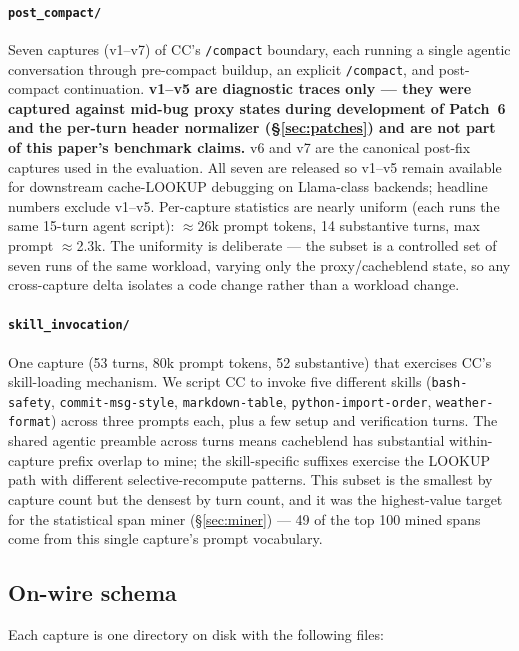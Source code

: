 \paragraph{\texttt{post\_compact/}} Seven captures (v1--v7) of CC's
\texttt{/compact} boundary, each running a single agentic conversation
through pre-compact buildup, an explicit \texttt{/compact}, and
post-compact continuation. \textbf{v1--v5 are diagnostic traces only ---
they were captured against mid-bug proxy states during development of
Patch~6 and the per-turn header normalizer (\S\ref{sec:patches}) and
are not part of this paper's benchmark claims.} v6 and v7 are the
canonical post-fix captures used in the evaluation. All seven are
released so v1--v5 remain available for downstream cache-LOOKUP
debugging on Llama-class backends; headline numbers exclude v1--v5. Per-capture statistics are nearly uniform (each
runs the same 15-turn agent script): $\approx$26k prompt tokens, 14
substantive turns, max prompt $\approx$2.3k. The uniformity is
deliberate --- the subset is a controlled set of seven runs of the same
workload, varying only the proxy/cacheblend state, so any cross-capture
delta isolates a code change rather than a workload change.

\paragraph{\texttt{skill\_invocation/}} One capture (53 turns, 80k
prompt tokens, 52 substantive) that exercises CC's skill-loading
mechanism. We script CC to invoke five different skills (\texttt{bash-safety},
\texttt{commit-msg-style}, \texttt{markdown-table},
\texttt{python-import-order}, \texttt{weather-format}) across three
prompts each, plus a few setup and verification turns. The shared
agentic preamble across turns means cacheblend has substantial
within-capture prefix overlap to mine; the skill-specific suffixes
exercise the LOOKUP path with different selective-recompute patterns.
This subset is the smallest by capture count but the densest by turn
count, and it was the highest-value target for the statistical span
miner (\S\ref{sec:miner}) --- 49 of the top 100 mined spans come from
this single capture's prompt vocabulary.

\subsection{On-wire schema}
\label{sec:dataset-schema}

Each capture is one directory on disk with the following files:

